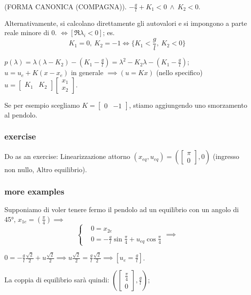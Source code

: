 (FORMA CANONICA (COMPAGNA)). $-\frac{g}{l} + K_1 < 0\ \land\ K_2 < 0$.

Alternativamente, si calcolano direttamente gli autovalori e si impongono a parte reale minore di 0. $\iff [\Re{\lambda_i} < 0]$; es.
\[
	K_1 = 0,\ K_2 = -1 \iff \{K_1 < \frac{g}{l},\ K_2 < 0\}
\]

$p(\lambda) = \lambda(\lambda - K_2)  - (K_1 - \frac{g}{l}) = \lambda^2 - K_2\lambda - (K_1 - \frac{g}{l})$;
$u = u_e + K(x-x_e)$ in generale $\implies (u=Kx)$ (nello specifico) $u = \begin{bmatrix}K_1&K_2\end{bmatrix}\begin{bmatrix}x_1\\x_2\end{bmatrix}$.

Se per esempio scegliamo $K=\begin{bmatrix}0&-1\end{bmatrix}$, stiamo aggiungendo uno smorzamento al pendolo.

\subsubsection{exercise}

Do as an exercise: Linearizzazione attorno $(x_{eq},u_{eq}) = (\begin{bmatrix}\pi\\0\end{bmatrix}, 0)$ (ingresso non nullo, Altro equilibrio).

\subsubsection{more examples}

Supponiamo di voler tenere fermo il pendolo ad un equilibrio con un angolo di 45°, $x_{1e} = (\frac{\pi}{4}) \implies$
\[	
	\left\{
	\begin{aligned}
	&0 = x_{2e} \\
	&0 = -\frac{g}{l}\sin{\frac{\pi}{4}} + u_{eq}\cos{\frac{\pi}{4}}
	\end{aligned} 
	\right. \implies 
\]

$0 = -\frac{g}{l}\frac{\sqrt{2}}{2} + u\frac{\sqrt{2}}{2} \implies u\frac{\sqrt{2}}{2} = \frac{g}{l}\frac{\sqrt{2}}{2} \implies [u_e = \frac{g}{l}]$.

La coppia di equilibrio sarà quindi: $(\begin{bmatrix}\frac{\pi}{4}\\0\end{bmatrix}, \frac{g}{l})$;

